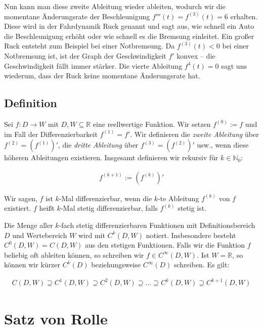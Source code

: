 \documentclass[fontsize=9pt,
               parskip=half-,
               DIV=14,
               listof=chapterentry,
               tocflat]{scrbook}
\begin{document}
Nun kann man diese zweite Ableitung wieder ableiten, wodurch wir die momentane Änderungsrate der Beschleunigung $f'''(t)=f^{(3)}(t)=6$ erhalten. Diese wird in der Fahrdynamik Ruck genannt und sagt aus, wie schnell ein Auto die Beschleunigung erhöht oder wie schnell es die Bremsung einleitet. Ein großer Ruck entsteht zum Beispiel bei einer Notbremsung. Da $f^{(3)}(t)<0$ bei einer Notbremsung ist, ist der Graph der Geschwindigkeit $f'$ konvex – die Geschwindigkeit fällt immer stärker. Die vierte Ableitung $f^{4}(t)=0$ sagt uns wiederum, dass der Ruck keine momentane Änderungsrate hat.

\section{Definition}

\begin{definition*}
Sei $f:D\to W$ mit $D,W\subseteq \mathbb {R} $ eine reellwertige Funktion. Wir setzen $f^{(0)}:=f$ und im Fall der Differenzierbarkeit $f^{(1)}=f'$. Wir definieren die \emph{zweite Ableitung} über $f^{(2)}=\left(f^{(1)}\right)'$, die \emph{dritte Ableitung} über $f^{(3)}=\left(f^{(2)}\right)'$ usw., wenn diese höheren Ableitungen existieren. Insgesamt definieren wir rekursiv für $k\in \mathbb {N} _{0}$:

\begin{align*}
f^{(k+1)}:=\left(f^{(k)}\right)'
\end{align*}

Wir sagen, $f$ ist $k$-Mal differenzierbar, wenn die $k$-te Ableitung $f^{(k)}$ von $f$ existiert. $f$ heißt $k$-Mal stetig differenzierbar, falls $f^{(k)}$ stetig ist.

\end{definition*}

Die Menge aller $k$-fach stetig differenzierbaren Funktionen mit Definitionsbereich $D$ und Wertebereich $W$ wird mit $C^{k}(D,W)$ notiert. Insbesondere besteht $C^{0}(D,W)=C(D,W)$ aus den stetigen Funktionen. Falls wir die Funktion $f$ beliebig oft ableiten können, so schreiben wir $f\in C^{\infty }(D,W)$. Ist $W=\mathbb {R} $, so können wir kürzer $C^{k}(D)$ beziehungsweise $C^{\infty }(D)$ schreiben. Es gilt:

\begin{align*}
C(D,W)\supseteq C^{1}(D,W)\supseteq C^{2}(D,W)\supseteq \ldots \supseteq C^{k}(D,W)\supseteq C^{k+1}(D,W)
\end{align*}

\chapter{Satz von Rolle}
\end{document}

